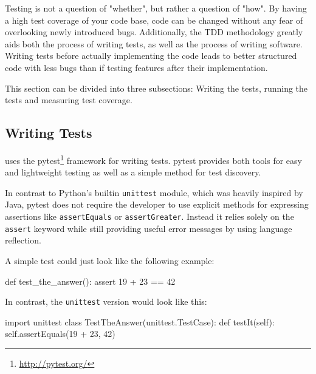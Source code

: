 
\noindent Testing is not a question of "whether", but rather a question of
"how". By having a high test coverage of your code base, code can be changed
without any fear of overlooking newly introduced bugs. Additionally, the TDD
methodology greatly aids both the process of writing tests, as well as the
process of writing software. Writing tests before actually implementing the code
leads to better structured code with less bugs than if testing features after
their implementation.

This section can be divided into three subsections: Writing the tests, running
the tests and measuring test coverage.

\subsection{Writing Tests}

\tangible{} uses the pytest\footnote{\url{http://pytest.org/}} framework for
writing tests. pytest provides both tools for easy and lightweight testing as
well as a simple method for test discovery.

In contrast to Python's builtin \texttt{unittest} module, which was heavily
inspired by Java, pytest does not require the developer to use explicit methods
for expressing assertions like \texttt{assertEquals} or \texttt{assertGreater}.
Instead it relies solely on the \texttt{assert} keyword while still providing
useful error messages by using language reflection.

A simple test could just look like the following example:

\vspace{.5\baselineskip}
\begin{pythoncode}
def test_the_answer():
    assert 19 + 23 == 42
\end{pythoncode}

\noindent In contrast, the \texttt{unittest} version would look like this:

\vspace{.5\baselineskip}
\begin{pythoncode}
import unittest
class TestTheAnswer(unittest.TestCase):
    def testIt(self):
        self.assertEquals(19 + 23, 42)
\end{pythoncode}

